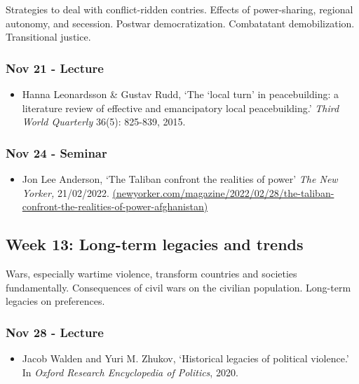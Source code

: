 \documentclass[12pt, a4paper]{article}
\begin{document}
Strategies to deal with conflict-ridden contries. Effects of power-sharing, regional autonomy, and secession. Postwar democratization. Combatatant demobilization. Transitional justice.

\subsubsection*{Nov 21 - Lecture}

\begin{itemize}
\setlength\itemsep{0pt}
\item Hanna Leonardsson \& Gustav Rudd, `The ‘local turn’ in peacebuilding: a literature review of effective and emancipatory local peacebuilding.' \textit{Third World Quarterly} 36(5): 825-839, 2015.
\end{itemize}

\subsubsection*{Nov 24 - Seminar}

\begin{itemize}
\setlength\itemsep{0pt}
\item Jon Lee Anderson, `The Taliban confront the realities of power' \textit{The New Yorker,} 21/02/2022. \href{https://www.newyorker.com/magazine/2022/02/28/the-taliban-confront-the-realities-of-power-afghanistan}{(newyorker.com/magazine/2022/02/28/the-taliban-confront-the-realities-of-power-afghanistan)}
\end{itemize}


\hline %

\subsection*{Week 13: Long-term legacies and trends}

Wars, especially wartime violence, transform countries and societies fundamentally. Consequences of civil wars on the civilian population. Long-term legacies on preferences.

\subsubsection*{Nov 28 - Lecture}

\begin{itemize}
\setlength\itemsep{0pt}
\item Jacob Walden and Yuri M. Zhukov, `Historical legacies of political violence.' In \textit{Oxford Research Encyclopedia of Politics}, 2020.
\end{itemize}
\end{document}
